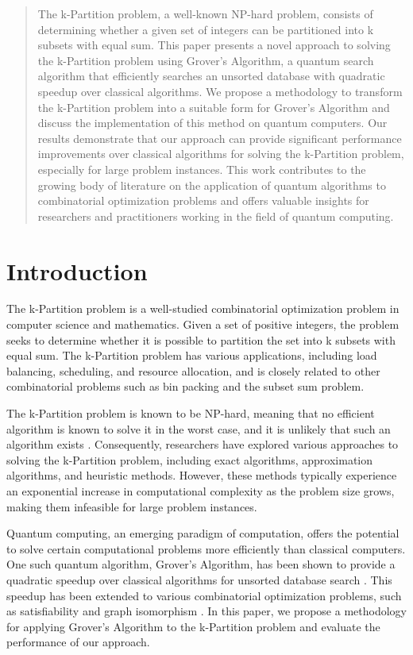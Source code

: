 \begin{abstract}
The k-Partition problem, a well-known NP-hard problem, consists of determining whether a given set of integers can be partitioned into k subsets with equal sum. This paper presents a novel approach to solving the k-Partition problem using Grover's Algorithm, a quantum search algorithm that efficiently searches an unsorted database with quadratic speedup over classical algorithms. We propose a methodology to transform the k-Partition problem into a suitable form for Grover's Algorithm and discuss the implementation of this method on quantum computers. Our results demonstrate that our approach can provide significant performance improvements over classical algorithms for solving the k-Partition problem, especially for large problem instances. This work contributes to the growing body of literature on the application of quantum algorithms to combinatorial optimization problems and offers valuable insights for researchers and practitioners working in the field of quantum computing.

\end{abstract}

\section{Introduction}

The k-Partition problem is a well-studied combinatorial optimization problem in computer science and mathematics. Given a set of positive integers, the problem seeks to determine whether it is possible to partition the set into k subsets with equal sum. The k-Partition problem has various applications, including load balancing, scheduling, and resource allocation, and is closely related to other combinatorial problems such as bin packing and the subset sum problem.

The k-Partition problem is known to be NP-hard, meaning that no efficient algorithm is known to solve it in the worst case, and it is unlikely that such an algorithm exists \cite{garey1979computers}. Consequently, researchers have explored various approaches to solving the k-Partition problem, including exact algorithms, approximation algorithms, and heuristic methods. However, these methods typically experience an exponential increase in computational complexity as the problem size grows, making them infeasible for large problem instances.

Quantum computing, an emerging paradigm of computation, offers the potential to solve certain computational problems more efficiently than classical computers. One such quantum algorithm, Grover's Algorithm, has been shown to provide a quadratic speedup over classical algorithms for unsorted database search \cite{grover1996fast}. This speedup has been extended to various combinatorial optimization problems, such as satisfiability and graph isomorphism \cite{childs2017quantum}. In this paper, we propose a methodology for applying Grover's Algorithm to the k-Partition problem and evaluate the performance of our approach.

